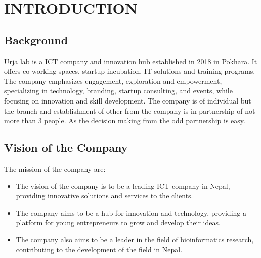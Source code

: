 \setcounter{page}{1}
\chapter{INTRODUCTION}
    \section{Background}
        Urja lab is a ICT company and innovation hub established in 2018 in Pokhara. It offers co-working spaces, startup incubation, IT solutions and training programs. The company emphasizes engagement, exploration and empowerment, specializing in technology, branding, startup consulting, and events, while focusing on innovation and skill development. The company is of individual but the branch and establishment of other from the company is in partnership of not more than 3 people. As the decision making from the odd partnership is easy.

    \section{Vision of the Company} 
    The mission of the company are:
  \begin{itemize}
    \item The vision of the company is to be a leading ICT company in Nepal, providing innovative solutions and services to the clients.
    \item The company aims to be a hub for innovation and technology, providing a platform for young entrepreneurs to grow and develop their ideas.
    \item The company also aims to be a leader in the field of bioinformatics research, contributing to the development of the field in Nepal.

  \end{itemize}  
    
    
    
    
